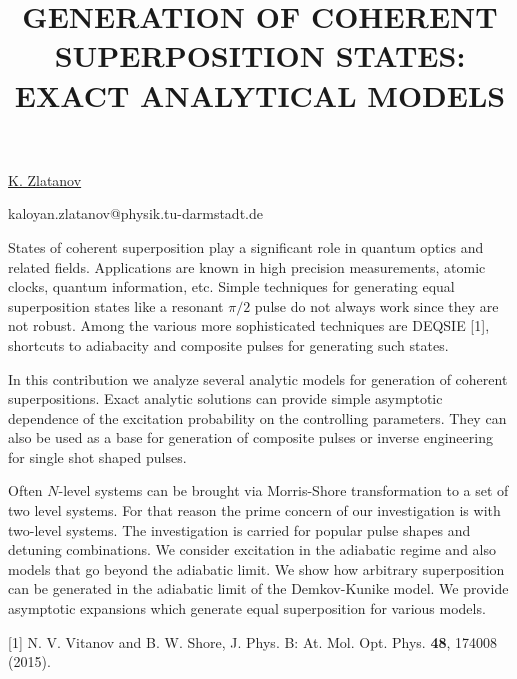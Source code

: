 \title{GENERATION OF COHERENT SUPERPOSITION STATES: EXACT ANALYTICAL MODELS}

\underline{K. Zlatanov} 

{\normalsize{\vspace{-4mm}
\darmstadt
\vspace{-4mm}

\unisofia

\email kaloyan.zlatanov@physik.tu-darmstadt.de}}

States of coherent superposition play a significant role in quantum optics and related fields. Applications are known in high precision measurements, atomic clocks, quantum information, etc. Simple techniques for generating equal superposition states like a resonant $\pi/2$ pulse  do not always work since they are not robust. Among the various more sophisticated techniques are DEQSIE [1], shortcuts to adiabacity and composite pulses for generating such states.

In this contribution we analyze several analytic models for generation of coherent superpositions. Exact analytic solutions can provide simple asymptotic dependence of the excitation probability on the controlling parameters. They can also be used as a base for generation of composite pulses or inverse engineering for single shot shaped pulses.

Often $N$-level systems can be brought via Morris-Shore transformation to a set of two level systems. For that reason the prime concern of our investigation is with two-level systems. The investigation is carried for popular pulse shapes and detuning combinations. We consider excitation in the adiabatic regime and also models that go beyond the adiabatic limit. We show how arbitrary superposition can be generated in the adiabatic limit of the Demkov-Kunike model. We provide asymptotic expansions which generate equal superposition for various models.

{\normalsize
[1] N. V. Vitanov and B. W. Shore, J. Phys. B: At. Mol. Opt. Phys. \textbf{48}, 174008 (2015).
}

\vspace{\baselineskip} 